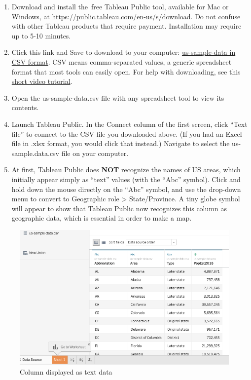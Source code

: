 \documentclass[
  english,
]{book}
\begin{document}
\begin{enumerate}
\def\labelenumi{\arabic{enumi})}
\item
  Download and install the~free Tableau Public tool, available for Mac or Windows, at \url{https://public.tableau.com/en-us/s/download}. Do not confuse with other Tableau products that require payment. Installation may require up to 5-10 minutes.
\item
  Click this link and Save to download to your computer: \href{data/us-sample-data.csv}{us-sample-data in CSV format}. CSV means comma-separated values, a generic spreadsheet format that most tools can easily open. For help with downloading, see this \href{https://www.youtube.com/watch?v=-04PQldP9HQ}{short video tutorial}.
\item
  Open the us-sample-data.csv file with any spreadsheet tool to view its contents.
\item
  Launch Tableau Public. In the Connect column of the first screen, click ``Text file'' to connect to the CSV file you downloaded above. (If you had an Excel file in .xlsx format, you would click that instead.) Navigate to select the us-sample.data.csv file on your computer.
\item
  At first, Tableau Public does \textbf{NOT} recognize the names of US areas, which initially appear simply as ``text'' values (with the ``Abc'' symbol). Click and hold down the mouse directly on the ``Abc'' symbol, and use the drop-down menu to convert to Geographic role \textgreater{} State/Province. A tiny globe symbol will appear to show that Tableau Public now recognizes this column as geographic data, which is essential in order to make a map.
\end{enumerate}

\begin{figure}
\centering
\includegraphics{images/06-map/tableau-polygon-1.png}
\caption{Column displayed as text data}
\end{figure}
\end{document}
